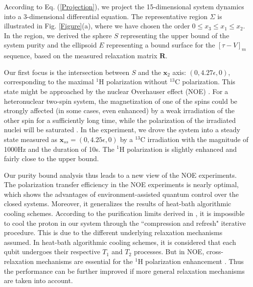 \documentclass[prl,aps,twocolumn, reprint, amsmath,amssymb,showpacs,superscriptaddress]{revtex4}
\begin{document}
According to Eq. (\ref{Projection}), we project the 15-dimensional system dynamics into a 3-dimensional differential equation. The representative region $\Sigma$ is illustrated in Fig. \ref{Figure}(a), where we have chosen the order $0 \le x_3 \le x_1 \le x_2$.
In the region, we derived the sphere $S$ representing the upper bound of the system purity and the ellipsoid $E$ representing a bound surface for the ${\left[ {\tau } - {V}  \right]_m}$ sequence, based on the measured relaxation matrix $\mathbf{R}$.


Our first focus is the intersection between $S$ and the $\bm{x}_2$ axis: $(0, 4.27\epsilon, 0)$, corresponding to the maximal $^{1}$H polarization without $^{13}$C polarization. This state might be approached by the nuclear Overhauser effect (NOE)  \cite{L}. For a heteronuclear two-spin system, the magnetization of one of the spins could be strongly affected (in some cases, even enhanced) by a weak irradiation of the other spin for a sufficiently long time, while the polarization of the irradiated nuclei will be saturated \cite{L}.  In the experiment, we drove the system into a steady state measured as $\bm{x}_{ss} = (0, 4.25\epsilon, 0)$ by a $^{13}$C  irradiation with the magnitude of 1000Hz and the duration of 10s. The $^{1}$H polarization is slightly enhanced and fairly close to the upper bound.

Our purity bound analysis thus leads  to a new view of the NOE experiments. The polarization transfer efficiency in the NOE experiments is nearly optimal, which shows the advantages of environment-assisted quantum control over the closed systems.  Moreover, it generalizes the results of heat-bath algorithmic cooling schemes. According to the purification limits derived in \cite{RMBL}, it is impossible to cool the proton in our system through the ``compression and refresh" iterative procedure. This is due to the different underlying relaxation mechanisms assumed. In heat-bath algorithmic cooling schemes, it is considered that each qubit undergoes their respective $T_1$ and $T_2$ processes. But in NOE, cross-relaxation mechanisms are essential for the $^{1}$H polarization enhancement \cite{L}. Thus the performance can be further improved if more general relaxation mechanisms are taken into account.
\end{document}
